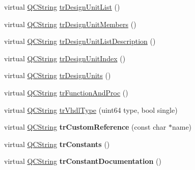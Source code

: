 \begin{DoxyCompactItemize}
\item 
virtual \mbox{\hyperlink{class_q_c_string}{Q\+C\+String}} \mbox{\hyperlink{class_translator_portuguese_a25df884d1e395c824de2d2b4f63418bb}{tr\+Design\+Unit\+List}} ()
\item 
virtual \mbox{\hyperlink{class_q_c_string}{Q\+C\+String}} \mbox{\hyperlink{class_translator_portuguese_aba5f24ecb9b51fcd87434d54321b97e7}{tr\+Design\+Unit\+Members}} ()
\item 
virtual \mbox{\hyperlink{class_q_c_string}{Q\+C\+String}} \mbox{\hyperlink{class_translator_portuguese_ad554784bb827f5670ed142f43de26108}{tr\+Design\+Unit\+List\+Description}} ()
\item 
virtual \mbox{\hyperlink{class_q_c_string}{Q\+C\+String}} \mbox{\hyperlink{class_translator_portuguese_aa1916bf02d73b518c8859c4caf91ecbc}{tr\+Design\+Unit\+Index}} ()
\item 
virtual \mbox{\hyperlink{class_q_c_string}{Q\+C\+String}} \mbox{\hyperlink{class_translator_portuguese_a5bb664cae0c28341e4ab0d0495079f5e}{tr\+Design\+Units}} ()
\item 
virtual \mbox{\hyperlink{class_q_c_string}{Q\+C\+String}} \mbox{\hyperlink{class_translator_portuguese_a8fa505a278cfb245d4f2e5ab80837102}{tr\+Function\+And\+Proc}} ()
\item 
virtual \mbox{\hyperlink{class_q_c_string}{Q\+C\+String}} \mbox{\hyperlink{class_translator_portuguese_a6325d2a54184a560be92f926eecbe323}{tr\+Vhdl\+Type}} (uint64 type, bool single)
\item 
\mbox{\label{class_translator_portuguese_ae7a605ad7e727adc5b951870bd2e4dc5}} 
virtual \mbox{\hyperlink{class_q_c_string}{Q\+C\+String}} {\bfseries tr\+Custom\+Reference} (const char $\ast$name)
\item 
\mbox{\label{class_translator_portuguese_a147ecfca3afd4475422a14baa0726e1e}} 
virtual \mbox{\hyperlink{class_q_c_string}{Q\+C\+String}} {\bfseries tr\+Constants} ()
\item 
\mbox{\label{class_translator_portuguese_a24b46b4a274125729834f0d8301f5149}} 
virtual \mbox{\hyperlink{class_q_c_string}{Q\+C\+String}} {\bfseries tr\+Constant\+Documentation} ()
\item 
\mbox{\label{class_translator_portuguese_ad372206763a227d4a483fcc4ca4475aa}} 

\end{DoxyCompactItemize}
